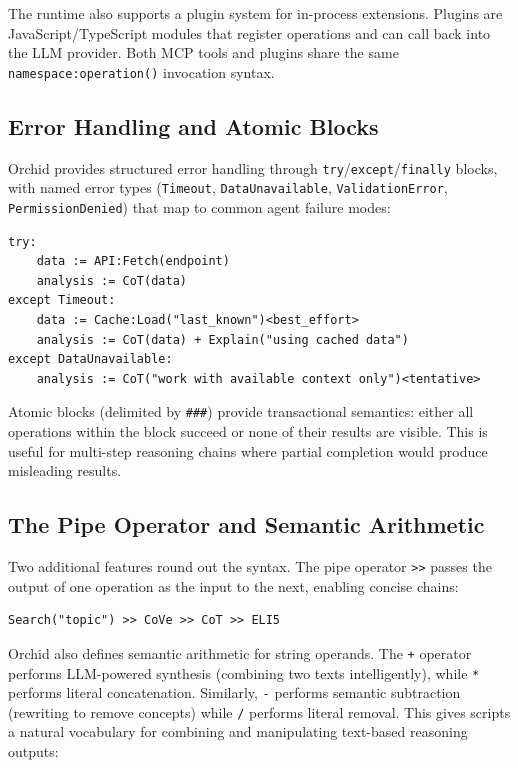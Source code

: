 \documentclass[11pt,a4paper]{article}
\begin{document}
The runtime also supports a plugin system for in-process extensions. Plugins are JavaScript/TypeScript modules that register operations and can call back into the LLM provider. Both MCP tools and plugins share the same \texttt{namespace:operation()} invocation syntax.

\subsection{Error Handling and Atomic Blocks}

Orchid provides structured error handling through \texttt{try}/\texttt{except}/\texttt{finally} blocks, with named error types (\texttt{Timeout}, \texttt{DataUnavailable}, \texttt{ValidationError}, \texttt{PermissionDenied}) that map to common agent failure modes:

\begin{lstlisting}[language=orchid]
try:
    data := API:Fetch(endpoint)
    analysis := CoT(data)
except Timeout:
    data := Cache:Load("last_known")<best_effort>
    analysis := CoT(data) + Explain("using cached data")
except DataUnavailable:
    analysis := CoT("work with available context only")<tentative>
\end{lstlisting}

Atomic blocks (delimited by \texttt{\#\#\#}) provide transactional semantics: either all operations within the block succeed or none of their results are visible. This is useful for multi-step reasoning chains where partial completion would produce misleading results.

\subsection{The Pipe Operator and Semantic Arithmetic}

Two additional features round out the syntax. The pipe operator \texttt{>{}>} passes the output of one operation as the input to the next, enabling concise chains:

\begin{lstlisting}[language=orchid]
Search("topic") >> CoVe >> CoT >> ELI5
\end{lstlisting}

Orchid also defines semantic arithmetic for string operands. The \texttt{+} operator performs LLM-powered synthesis (combining two texts intelligently), while \texttt{*} performs literal concatenation. Similarly, \texttt{-} performs semantic subtraction (rewriting to remove concepts) while \texttt{/} performs literal removal. This gives scripts a natural vocabulary for combining and manipulating text-based reasoning outputs:
\end{document}
